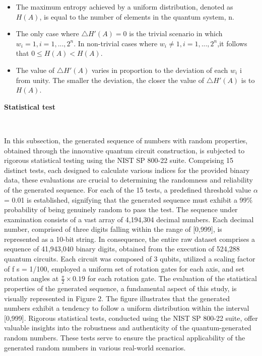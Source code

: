 \documentclass[12pt]{article}
\begin{document}
	   		\begin{itemize}
	   			\item The maximum entropy achieved by a uniform distribution, denoted as $H(A)$, is equal to the number of elements in the
	   			quantum system, n.
	   			\item The only case where $\triangle H'(A) = 0$ is the trivial scenario in which $w_i=1, 
	   			i=1,...,2^n$. In non-trivial cases where $w_i\neq1,	i=1,...,2^n$,it follows that
	   			$ 0 \leq H(A) < H(A)$. 
	   			\item The value of $\triangle H'(A)$ varies in proportion to the deviation of each $w_i$ i from unity. The smaller the deviation, the closer the
	   			value of  $\triangle H'(A)$ is to $H(A)$.
	   		\end{itemize}
	   		
	   		{\raggedright\large\textbf{Statistical test}}\\\par
	   		{In this subsection, the generated sequence of numbers with random properties, obtained through the innovative quantum circuit
	   			construction, is subjected to rigorous statistical testing using the NIST SP 800-22 suite. Comprising 15 distinct tests, each
	   			designed to calculate various indices for the provided binary data, these evaluations are crucial to determining the randomness
	   			and reliability of the generated sequence.
	   			For each of the 15 tests, a predefined threshold value $\alpha$ = 0.01 is established, signifying that the generated sequence must
	   			exhibit a 99\% probability of being genuinely random to pass the test. The sequence under examination consists of a vast
	   			array of 4,194,304 decimal numbers. Each decimal number, comprised of three digits falling within the range of [0,999], is
	   			represented as a 10-bit string. In consequence, the entire raw dataset comprises a sequence of 41,943,040 binary digits, obtained
	   			from the execution of 524,288 quantum circuits. Each circuit was composed of 3 qubits, utilized a scaling factor of f s = 1/100,
	   			employed a uniform set of rotation gates for each axis, and set rotation angles at $\frac{\pi}{2}\times0.19$ for each rotation gate.
	   			The evaluation of the statistical properties of the generated sequence, a fundamental aspect of this study, is visually
	   			represented in Figure 2. The figure illustrates that the generated numbers exhibit a tendency to follow a uniform distribution
	   			within the interval [0,999]. Rigorous statistical tests, conducted using the NIST SP 800-22 suite, offer valuable insights into the
	   			robustness and authenticity of the quantum-generated random numbers. These tests serve to ensure the practical applicability of
	   			the generated random numbers in various real-world scenarios.}\\
	   		
\end{document}
